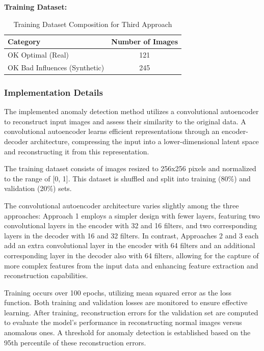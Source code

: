 \documentclass[12pt,DIV14,BCOR12mm,a4paper,footinclude=false,headinclude,parskip=half-,twoside,openright,cleardoublepage=empty,toc=index,bibliography=totoc,listof=totoc]{scrreprt}
\numberwithin{equation}{chapter}
\begin{document}
\textbf{Training Dataset:}
\begin{table} 
    \centering
    \caption{Training Dataset Composition for Third Approach}
    \label{tab:third-approach}
    \begin{tabular}{lc} %
        \toprule
        \textbf{Category} & \textbf{Number of Images} \\ 
        \midrule
        OK Optimal (Real) & 121 \\ 
        OK Bad Influences (Synthetic) & 245 \\ 
        \bottomrule
    \end{tabular}
\end{table}

\subsubsection{Implementation Details}

The implemented anomaly detection method utilizes a convolutional autoencoder to reconstruct input images and assess their similarity to the original data. A convolutional autoencoder learns efficient representations through an encoder-decoder architecture, compressing the input into a lower-dimensional latent space and reconstructing it from this representation.

The training dataset consists of images resized to 256x256 pixels and normalized to the range of [0, 1]. This dataset is shuffled and split into training (80\%) and validation (20\%) sets.

The convolutional autoencoder architecture varies slightly among the three approaches: Approach 1 employs a simpler design with fewer layers, featuring two convolutional layers in the encoder with 32 and 16 filters, and two corresponding layers in the decoder with 16 and 32 filters. In contrast, Approaches 2 and 3 each add an extra convolutional layer in the encoder with 64 filters and an additional corresponding layer in the decoder also with 64 filters, allowing for the capture of more complex features from the input data and enhancing feature extraction and reconstruction capabilities.

Training occurs over 100 epochs, utilizing mean squared error as the loss function. Both training and validation losses are monitored to ensure effective learning. After training, reconstruction errors for the validation set are computed to evaluate the model's performance in reconstructing normal images versus anomalous ones. A threshold for anomaly detection is established based on the 95th percentile of these reconstruction errors.
\end{document}
